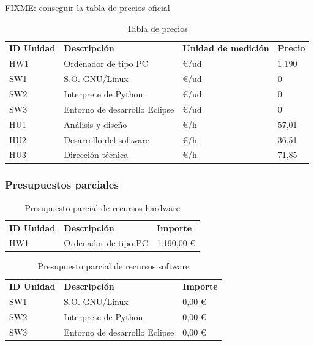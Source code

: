 FIXME: conseguir la tabla de precios oficial

\begin{table}[H]
 \begin{center}
  \begin{tabular}{llll}
	\textbf{ID Unidad} & \textbf{Descripción} & \textbf{Unidad de medición} & \textbf{Precio} \\
	HW1 & Ordenador de tipo PC & \euro/ud & 1.190 \\
	SW1 & S.O. GNU/Linux & \euro/ud & 0 \\
	SW2 & Interprete de Python & \euro/ud & 0 \\
	SW3 & Entorno de desarrollo Eclipse & \euro/ud & 0 \\
	HU1 & Análisis y diseño & \euro/h & 57,01 \\
	HU2 & Desarrollo del software & \euro/h & 36,51 \\
	HU3 & Dirección técnica & \euro/h & 71,85 
  \end{tabular}
  \caption{Tabla de precios}
 \end{center}
\end{table}

\subsubsection{Presupuestos parciales}

\begin{table}[H]
 \begin{center}
  \begin{tabular}{lll}
	\textbf{ID Unidad} & \textbf{Descripción} & \textbf{Importe} \\
	HW1 & Ordenador de tipo PC & 1.190,00 \euro
  \end{tabular}
  \caption{Presupuesto parcial de recursos hardware}
 \end{center}
\end{table}

\begin{table}[H]
 \begin{center}
  \begin{tabular}{lll}
	\textbf{ID Unidad} & \textbf{Descripción} & \textbf{Importe} \\
	SW1 & S.O. GNU/Linux & 0,00 \euro \\
	SW2 & Interprete de Python & 0,00 \euro \\
	SW3 & Entorno de desarrollo Eclipse & 0,00 \euro
  \end{tabular}
  \caption{Presupuesto parcial de recursos software}
 \end{center}
\end{table}

